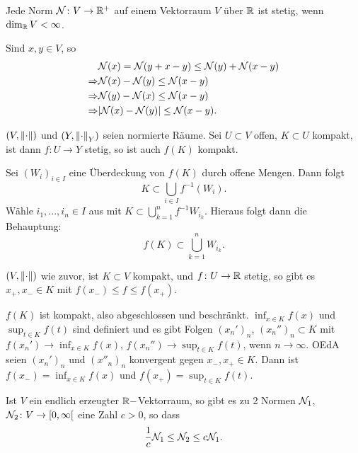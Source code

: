 \begin{lemma}
	Jede Norm $ \mathcal N\colon V\rightarrow\mathbb{R}^+ $ auf einem Vektorraum $ V $ \"uber $ \mathbb{R} $ ist stetig, wenn $ \dim_{\mathbb{R}} V<\infty $.
\end{lemma}
\begin{beweis}
	Sind $ x,y\in V $, so
	\begin{align*} &\mathcal N(x)=\mathcal N(y+x-y)\leq \mathcal N(y)+\mathcal N(x-y)\\
	\Rightarrow&\mathcal N(x)-\mathcal N(y)\leq\mathcal N(x-y)\\
	\Rightarrow&\mathcal N(y)-\mathcal N(x)\leq\mathcal N(x-y)\\
	\Rightarrow&|\mathcal N(x)-\mathcal N(y)|\leq\mathcal N(x-y).
	\end{align*}
\end{beweis}
\begin{lemma}
	$ (V,\left\|\cdot\right\|) $ und $ (Y,\left\|\cdot\right\|_Y) $ seien normierte R\"aume. Sei $ U\subset V $ offen, $ K\subset U $ kompakt, ist dann $ f\colon U\rightarrow Y $ stetig, so ist auch $ f(K) $ kompakt.
\end{lemma}
\begin{beweis}
	Sei $ (W_i)_{i\in I} $ eine \"Uberdeckung von $ f(K) $ durch offene Mengen. Dann folgt
	\[ K\subset\bigcup_{i\in I}f^{-1}(W_i). \]
	W\"ahle $ i_1,...,i_n\in I $ aus mit $ K\subset\bigcup_{k=1}^nf^{-1}W_{i_k} $. Hieraus folgt dann die Behauptung:
	\[ f(K)\subset\bigcup_{k=1}^n W_{i_k}. \]
\end{beweis}
\begin{satz}
	$ (V,\left\|\cdot\right\|) $ wie zuvor, ist $ K\subset V $ kompakt, und $ f\colon U\rightarrow\mathbb{R} $ stetig, so gibt es $ x_+,x_-\in K $ mit $ f(x_-)\leq f\leq f(x_+) $.
\end{satz}
\begin{beweis}
	$ f(K) $ ist kompakt, also abgeschlossen und beschr\"ankt. $ \inf_{x\in K} f(x)$ und $ \sup_{t\in K}f(t) $ sind definiert und es gibt Folgen $ (x_n')_n $, $ (x_n'')_n\subset K $ mit $ f(x_n')\rightarrow\inf_{x\in K}f(x) $, $ f(x_n'')\rightarrow\sup_{t\in K}f(t) $, wenn $ n\to\infty $. OEdA seien $ (x_n')_n $ und $ (x''_n)_n $ konvergent gegen $ x_-,x_+\in K $. Dann ist $ f(x_-)=\inf_{x\in K}f(x) $ und $ f(x_+)=\sup_{t\in K}f(t) $.
\end{beweis}
\begin{satz}
	Ist $ V $ ein endlich erzeugter $ \mathbb{R}- $Vektorraum, so gibt es zu 2 Normen $ \mathcal N_1 $, $ \mathcal N_2\colon V\rightarrow[0,\infty[ $ eine Zahl $ c>0 $, so dass
	\[ \frac{1}{c}\mathcal N_1\leq\mathcal N_2\leq c\mathcal N_1. \]
\end{satz}
